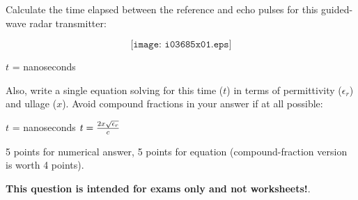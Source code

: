

Calculate the time elapsed between the reference and echo pulses for this guided-wave radar transmitter:

$$\texttt{[image: i03685x01.eps]}$$

$t$ = \underbar{\hskip 50pt} nanoseconds

\vskip 10pt

Also, write a single equation solving for this time ($t$) in terms of permittivity ($\epsilon_r$) and ullage ($x$).  Avoid compound fractions in your answer if at all possible:







$t$ =  nanoseconds \hskip 30pt $t = {2x \sqrt{\epsilon_r} \over c}$

\vskip 10pt

5 points for numerical answer, 5 points for equation (compound-fraction version is worth 4 points).







{\bf This question is intended for exams only and not worksheets!}.



